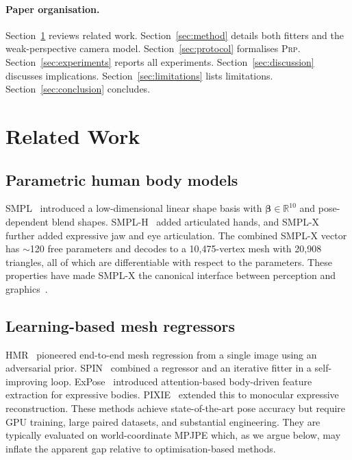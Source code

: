 \documentclass[twocolumn,10pt]{svjour3}
\newcommand{\prp}{\textsc{Prp}}
\begin{document}
\paragraph{Paper organisation.}
Section~\ref{sec:related} reviews related work. Section~\ref{sec:method} details both fitters and the weak-perspective camera model. Section~\ref{sec:protocol} formalises \prp{}. Section~\ref{sec:experiments} reports all experiments. Section~\ref{sec:discussion} discusses implications. Section~\ref{sec:limitations} lists limitations. Section~\ref{sec:conclusion} concludes.

\section{Related Work}
\label{sec:related}

\subsection{Parametric human body models}
SMPL~\cite{SMPL} introduced a low-dimensional linear shape basis with $\boldsymbol{\beta}\!\in\!\mathbb{R}^{10}$ and pose-dependent blend shapes. SMPL-H~\cite{SMPLH} added articulated hands, and SMPL-X~\cite{SMPLX} further added expressive jaw and eye articulation. The combined SMPL-X vector has $\sim$120 free parameters and decodes to a 10,475-vertex mesh with 20,908 triangles, all of which are differentiable with respect to the parameters. These properties have made SMPL-X the canonical interface between perception and graphics~\cite{SMPL_simplify}.

\subsection{Learning-based mesh regressors}
HMR~\cite{HMR} pioneered end-to-end mesh regression from a single image using an adversarial prior. SPIN~\cite{SPIN} combined a regressor and an iterative fitter in a self-improving loop. ExPose~\cite{ExPose} introduced attention-based body-driven feature extraction for expressive bodies. PIXIE~\cite{PIXIE} extended this to monocular expressive reconstruction. These methods achieve state-of-the-art pose accuracy but require GPU training, large paired datasets, and substantial engineering. They are typically evaluated on world-coordinate MPJPE which, as we argue below, may inflate the apparent gap relative to optimisation-based methods.
\end{document}
